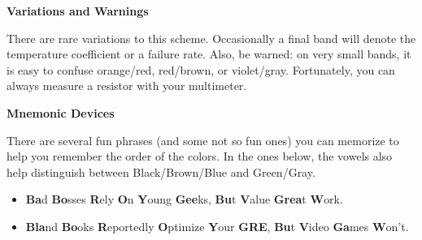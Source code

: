 \medskip
\textbf{Variations and Warnings}

There are rare variations to this scheme.  Occasionally a final band will denote the temperature coefficient or a failure rate.  Also, be warned: on very small bands, it is easy to confuse orange/red, red/brown, or violet/gray.  Fortunately, you can always measure a resistor with your multimeter.  

\medskip
\textbf{Mnemonic Devices}

There are several fun phrases (and some not so fun ones) you can memorize to help you remember the order of the colors.   In the ones below, the vowels also help distinguish between Black/Brown/Blue and Green/Gray.
\begin{itemize}[nosep]
\item \textbf{Ba}d \textbf{Bo}sses \textbf{R}ely \textbf{O}n \textbf{Y}oung \textbf{Gee}ks, \textbf{Bu}t \textbf{V}alue \textbf{Grea}t \textbf{W}ork.
\item \textbf{Bla}nd \textbf{Bo}oks \textbf{R}eportedly \textbf{O}ptimize \textbf{Y}our \textbf{GRE}, \textbf{Bu}t \textbf{V}ideo \textbf{Ga}mes \textbf{W}on't.
\end{itemize}

